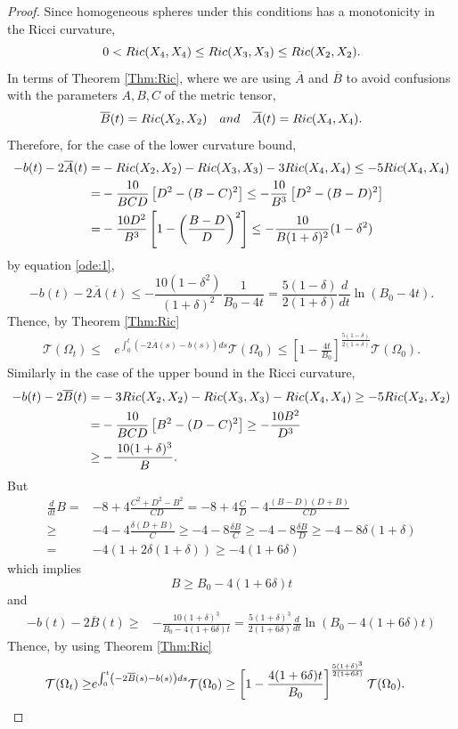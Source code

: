 \documentclass[10pt,a4paper]{amsart}
\begin{document}
\begin{proof}
Since homogeneous spheres under this conditions has a monotonicity in the Ricci curvature,
 $$
0<  {\rm Ric}(X_4,X_4)\leq   {\rm Ric}(X_3,X_3)\leq   {\rm Ric}(X_2,X_2).
 $$
In terms of Theorem \ref{Thm:Ric}, where we are using $\overline{A}$ and $\overline{B}$ to avoid confusions with the parameters $A,B,C$ of the metric tensor,  
 $$
\overline{B}(t)={\rm Ric}(X_2,X_2)\quad {\rm and} \quad \overline{A}(t)={\rm Ric}(X_4,X_4).
 $$
 Therefore, for the case of the lower curvature bound,
 $$
 \begin{aligned}
     -b(t)-2\overline{A}(t)=&-{\rm Ric}(X_2,X_2)-{\rm Ric}(X_3,X_3)-3{\rm Ric}(X_4,X_4)\leq -5{\rm Ric}(X_4,X_4)\\
     =& -\frac{10}{BCD}\left[D^2-(B-C)^2\right]\leq -\frac{10}{B^3}\left[D^2-(B-D)^2\right]\\
     =&-\frac{10D^2}{B^3}\left[1-\left(\frac{B-D}{D}\right)^2\right]\leq -\frac{10}{B(1+\delta)^2}(1-\delta^2)
 \end{aligned}
 $$
 by equation \eqref{ode:1},
 $$
 -b(t)-2\overline
{A}(t)\leq -\frac{10(1-\delta^2)}{(1+\delta)^2}\frac{1}{B_0-4t}=\frac{5(1-\delta)}{2(1+\delta)}\frac{d}{dt}\ln\left(B_0-4t\right).
 $$
 Thence, by Theorem \ref{Thm:Ric}
$$
\begin{aligned}
\mathcal{T}(\Omega_t)\leq& e^{\int_0^t\left(-2 \overline{A}(s)-b(s)\right)ds}\mathcal{T}(\Omega_0)\leq  \left[1-\frac{4t}{B_0}\right]^{\frac{5(1-\delta)}{2(1+\delta)}}\mathcal{T}(\Omega_0).
\end{aligned}
$$
 Similarly in the case of the upper bound in the Ricci curvature,
 $$
 \begin{aligned}
     -b(t)-2\overline{B}(t)=&-3{\rm Ric}(X_2,X_2)-{\rm Ric}(X_3,X_3)-{\rm Ric}(X_4,X_4)\geq -5{\rm Ric}(X_2,X_2)\\
     =& -\frac{10}{BCD}\left[B^2-(D-C)^2\right]\geq -\frac{10B^2}{D^3}\\
     \geq&-\frac{10(1+\delta)^3}{B}.
 \end{aligned}
 $$
But
$$
\begin{aligned}
    \frac{d}{dt}B=& -8+4\frac{C^2+D^2-B^2}{CD}=-8+4\frac{C}{D}-4\frac{(B-D)(D+B)}{CD}\\
    \geq&-4-4\frac{\delta(D+B)}{C} \geq -4-8\frac{\delta B}{C}\geq-4-8\frac{\delta B}{D}  \geq-4-8\delta(1+\delta)\\
    =&-4(1+2\delta(1+\delta)) \geq -4(1+6\delta) 
\end{aligned}
$$
which implies
$$
B\geq B_0-4(1+6\delta)t
$$
and
 $$
 \begin{aligned}
     -b(t)-2\overline{B}(t)
     \geq&-\frac{10(1+\delta)^3}{B_0-4(1+6\delta)t}=\frac{5(1+\delta)^3}{2(1+6\delta)}\frac{d}{dt}\ln\left(B_0-4(1+6\delta)t\right)
 \end{aligned}
 $$
 Thence, by using Theorem \ref{Thm:Ric}
$$
\begin{aligned}
\mathcal{T}(\Omega_t)\geq& e^{\int_0^t\left(-2 \overline{B}(s)-b(s)\right)ds}\mathcal{T}(\Omega_0)\geq  \left[1-\frac{4(1+6\delta)t}{B_0}\right]^{\frac{5(1+\delta)^3}{2(1+6\delta)}}\mathcal{T}(\Omega_0).  \mbox{\qedhere}
\end{aligned}
$$

 
\end{proof}
\end{document}
